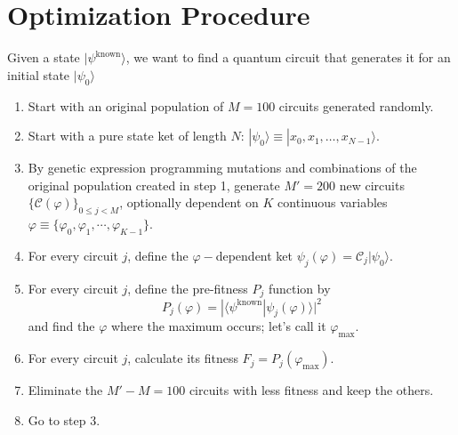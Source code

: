 \documentclass{article}
\begin{document}
\section{Optimization Procedure}
Given a state $|\psi^{\textrm{known}}\rangle$, we want to find a quantum
circuit that generates it for an initial state $|\psi_0\rangle$
\begin{enumerate}
	\item Start with an original population of $M=100$ circuits generated randomly.
	\item Start with a pure state ket of length $N$: $|\psi_0\rangle\equiv|x_0, x_1, \ldots, x_{N-1}\rangle$.
	\item By genetic expression programming mutations and combinations of the original 
	population created in step 1, generate $M'=200$ new circuits
	$\{\mathcal{C}(\varphi)\}_{0\le j<M}$, optionally dependent on $K$ continuous variables
	$\varphi\equiv\{\varphi_0, \varphi_1, \cdots, \varphi_{K-1}\}$.
	\item For every circuit $j$, define the $\varphi-$dependent ket $\psi_j(\varphi)=\mathcal{C}_j|\psi_0\rangle$.
	\item For every circuit $j$, define the pre-fitness $P_j$ function by
	\begin{equation}
		P_j(\varphi) = |\langle \psi^{\textrm{known}} | \psi_j(\varphi)\rangle|^2
	\end{equation}
	and find the $\varphi$ where the maximum occurs; let's call it $\varphi_{\textrm{max}}$.
	\item For every circuit $j$, calculate its fitness $F_j = P_j(\varphi_{\textrm{max}})$.
	\item Eliminate the $M'-M=100$ circuits with less fitness and keep the others.
	\item Go to step 3. 
\end{enumerate}
\end{document}

